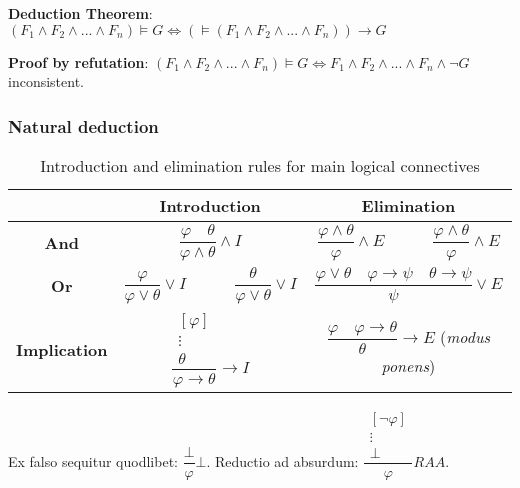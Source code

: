 \documentclass[]{article}
\begin{document}
\noindent \textbf{Deduction Theorem}: $(F_1 \land F_2 \land ... \land F_n) \models G \iff (\models(F_1 \land F_2 \land ... \land F_n)) \rightarrow G$

\noindent \textbf{Proof by refutation}: $(F_1 \land F_2 \land ... \land F_n) \models G \iff F_1 \land F_2 \land ... \land F_n \land \neg G $ inconsistent.

\subsubsection{Natural deduction}

\begin{table}[h]
	\centering
	\caption{Introduction and elimination rules for main logical connectives}
	\begin{tabular}{ |c |c|c | } 
		\hline
		& \textbf{Introduction} & \textbf{Elimination} \\
		\hline
		\textbf{And} & $\dfrac{\varphi \hspace{1em} \theta}{\varphi \land \theta}\land I$ & $\dfrac{\varphi \land \theta}{\varphi}\land E \hspace{3em} \dfrac{\varphi \land \theta}{\varphi}\land E$ \\
		\hline
		\textbf{Or} & $\dfrac{\varphi}{\varphi \lor \theta} \lor I \hspace{3em} \dfrac{\theta}{\varphi \lor \theta} \lor I$ & $\dfrac{\varphi \lor \theta \hspace{1em} \varphi \rightarrow \psi \hspace{1em} \theta \rightarrow \psi}{\psi} \lor E$ \\
		\hline
		\textbf{Implication} & $\dfrac{\begin{array}{c} [\varphi] \\ \vdots \\ \theta \end{array}}{\varphi \rightarrow \theta} \rightarrow I$ & $\dfrac{\varphi \hspace{1em} \varphi \rightarrow \theta}{\theta} \rightarrow E$ (\textit{modus ponens}) \\
		\hline
	\end{tabular}
\end{table}

\noindent Ex falso sequitur quodlibet: $\dfrac{\bot}{\varphi}\bot$. Reductio ad absurdum: $\dfrac{\begin{array}{c} [\neg \varphi] \\ \vdots \\ \bot \end{array}}{\varphi} RAA$.
\end{document}
